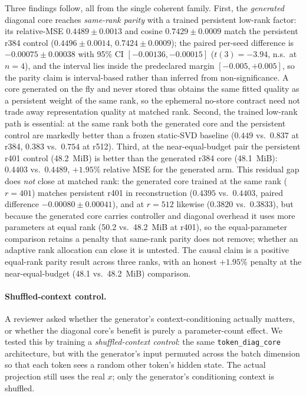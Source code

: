 Three findings follow, all from the single coherent family. First, the
\emph{generated} diagonal core reaches \emph{same-rank parity} with a trained
persistent low-rank factor: its relative-MSE $0.4489\pm0.0013$ and cosine
$0.7429\pm0.0009$ match the persistent r384 control ($0.4496\pm0.0014$,
$0.7424\pm0.0009$); the paired per-seed difference is $-0.00075\pm0.00038$
with 95\% CI $[-0.00136,-0.00015]$ ($t(3){=}-3.94$, n.s.\ at $n{=}4$), and
the interval lies inside the predeclared margin
$[-0.005,+0.005]$, so the parity claim is interval-based rather than
inferred from non-significance. A core generated on the fly and
never stored thus obtains the same fitted quality as a persistent weight of the
same rank, so the ephemeral no-store contract need not trade away
representation quality at matched rank. Second, the trained low-rank path is
essential: at the same rank both the generated core and the persistent control
are markedly better than a frozen static-SVD baseline ($0.449$ vs.\ $0.837$ at
r384, $0.383$ vs.\ $0.754$ at r512). Third, at the near-equal-budget pair the
persistent r401 control (48.2~MiB) is better than the generated r384 core
(48.1~MiB): $0.4403$ vs.\ $0.4489$, $+1.95\%$ relative MSE for the generated
arm. This residual gap does \emph{not} close at matched rank: the generated
core trained at the same rank ($r{=}401$) matches persistent r401 in
reconstruction ($0.4395$ vs.\ $0.4403$, paired difference
$-0.00080\pm0.00041$), and at $r{=}512$ likewise ($0.3820$ vs.\ $0.3833$),
but because the generated core carries controller and diagonal overhead it
uses more parameters at equal rank (50.2 vs.\ 48.2~MiB at r401), so the
equal-parameter comparison retains a penalty that same-rank parity does not
remove; whether an adaptive rank allocation can close it is untested. The
causal claim is a
positive equal-rank parity result across three ranks, with an honest
$+1.95\%$ penalty at the near-equal-budget (48.1 vs.\ 48.2~MiB) comparison.

\paragraph{Shuffled-context control.}
A reviewer asked whether the generator's context-conditioning actually
matters, or whether the diagonal core's benefit is purely a parameter-count
effect.  We tested this by training a \emph{shuffled-context control}:
the same \texttt{token\_diag\_core} architecture, but with the generator's
input permuted across the batch dimension so that each token sees a random
other token's hidden state.  The actual projection still uses the real $x$;
only the generator's conditioning context is shuffled.

